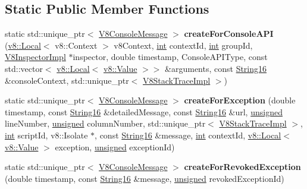 \subsection*{Static Public Member Functions}
\begin{DoxyCompactItemize}
\item 
\mbox{\label{classv8__inspector_1_1V8ConsoleMessage_a920e34cd09e0a90b24600a97fc7d1da7}} 
static std\+::unique\+\_\+ptr$<$ \mbox{\hyperlink{classv8__inspector_1_1V8ConsoleMessage}{V8\+Console\+Message}} $>$ {\bfseries create\+For\+Console\+A\+PI} (\mbox{\hyperlink{classv8_1_1Local}{v8\+::\+Local}}$<$ v8\+::\+Context $>$ v8\+Context, \mbox{\hyperlink{classint}{int}} context\+Id, \mbox{\hyperlink{classint}{int}} group\+Id, \mbox{\hyperlink{classv8__inspector_1_1V8InspectorImpl}{V8\+Inspector\+Impl}} $\ast$inspector, double timestamp, Console\+A\+P\+I\+Type, const std\+::vector$<$ \mbox{\hyperlink{classv8_1_1Local}{v8\+::\+Local}}$<$ \mbox{\hyperlink{classv8_1_1Value}{v8\+::\+Value}} $>$$>$ \&arguments, const \mbox{\hyperlink{classv8__inspector_1_1String16}{String16}} \&console\+Context, std\+::unique\+\_\+ptr$<$ \mbox{\hyperlink{classv8__inspector_1_1V8StackTraceImpl}{V8\+Stack\+Trace\+Impl}} $>$)
\item 
\mbox{\label{classv8__inspector_1_1V8ConsoleMessage_aaec28cf4c4b1d9922a3aab3cd680c1fb}} 
static std\+::unique\+\_\+ptr$<$ \mbox{\hyperlink{classv8__inspector_1_1V8ConsoleMessage}{V8\+Console\+Message}} $>$ {\bfseries create\+For\+Exception} (double timestamp, const \mbox{\hyperlink{classv8__inspector_1_1String16}{String16}} \&detailed\+Message, const \mbox{\hyperlink{classv8__inspector_1_1String16}{String16}} \&url, \mbox{\hyperlink{classunsigned}{unsigned}} line\+Number, \mbox{\hyperlink{classunsigned}{unsigned}} column\+Number, std\+::unique\+\_\+ptr$<$ \mbox{\hyperlink{classv8__inspector_1_1V8StackTraceImpl}{V8\+Stack\+Trace\+Impl}} $>$, \mbox{\hyperlink{classint}{int}} script\+Id, v8\+::\+Isolate $\ast$, const \mbox{\hyperlink{classv8__inspector_1_1String16}{String16}} \&message, \mbox{\hyperlink{classint}{int}} context\+Id, \mbox{\hyperlink{classv8_1_1Local}{v8\+::\+Local}}$<$ \mbox{\hyperlink{classv8_1_1Value}{v8\+::\+Value}} $>$ exception, \mbox{\hyperlink{classunsigned}{unsigned}} exception\+Id)
\item 
\mbox{\label{classv8__inspector_1_1V8ConsoleMessage_a7ba53683f7787d0fc7702bdcf6349e0f}} 
static std\+::unique\+\_\+ptr$<$ \mbox{\hyperlink{classv8__inspector_1_1V8ConsoleMessage}{V8\+Console\+Message}} $>$ {\bfseries create\+For\+Revoked\+Exception} (double timestamp, const \mbox{\hyperlink{classv8__inspector_1_1String16}{String16}} \&message, \mbox{\hyperlink{classunsigned}{unsigned}} revoked\+Exception\+Id)
\end{DoxyCompactItemize}


